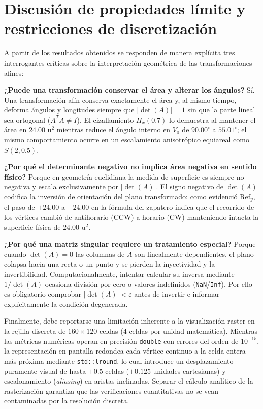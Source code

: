 \documentclass[a4paper,10pt]{article}
\begin{document}
\section{Discusión de propiedades límite y restricciones de discretización}

A partir de los resultados obtenidos se responden de manera explícita tres interrogantes críticas sobre la interpretación geométrica de las transformaciones afines:

\textbf{¿Puede una transformación conservar el área y alterar los ángulos?} Sí. Una transformación afín conserva exactamente el área y, al mismo tiempo, deforma ángulos y longitudes siempre que $|\det(A)|=1$ sin que la parte lineal sea ortogonal ($A^T A \neq I$). El cizallamiento $H_x(0.7)$ lo demuestra al mantener el área en $24.00\text{ u}^2$ mientras reduce el ángulo interno en $V_0$ de $90.00^\circ$ a $55.01^\circ$; el mismo comportamiento ocurre en un escalamiento anisotrópico equiareal como $S(2, 0.5)$.

\textbf{¿Por qué el determinante negativo no implica área negativa en sentido físico?} Porque en geometría euclidiana la medida de superficie es siempre no negativa y escala exclusivamente por $|\det(A)|$. El signo negativo de $\det(A)$ codifica la inversión de orientación del plano transformado: como evidenció $\mathrm{Ref}_y$, el paso de $+24.00$ a $-24.00$ en la fórmula del zapatero indica que el recorrido de los vértices cambió de antihorario (CCW) a horario (CW) manteniendo intacta la superficie física de $24.00\text{ u}^2$.

\textbf{¿Por qué una matriz singular requiere un tratamiento especial?} Porque cuando $\det(A) = 0$ las columnas de $A$ son linealmente dependientes, el plano colapsa hacia una recta o un punto y se pierden la inyectividad y la invertibilidad. Computacionalmente, intentar calcular su inversa mediante $1/\det(A)$ ocasiona división por cero o valores indefinidos (\texttt{NaN}/\texttt{Inf}). Por ello es obligatorio comprobar $|\det(A)| < \varepsilon$ antes de invertir e informar explícitamente la condición degenerada.

Finalmente, debe reportarse una limitación inherente a la visualización raster en la rejilla discreta de $160\times 120$ celdas ($4$ celdas por unidad matemática). Mientras las métricas numéricas operan en precisión \texttt{double} con errores del orden de $10^{-15}$, la representación en pantalla redondea cada vértice continuo a la celda entera más próxima mediante \texttt{std::lround}, lo cual introduce un desplazamiento puramente visual de hasta $\pm 0.5$ celdas ($\pm 0.125$ unidades cartesianas) y escalonamiento (\emph{aliasing}) en aristas inclinadas. Separar el cálculo analítico de la rasterización garantiza que las verificaciones cuantitativas no se vean contaminadas por la resolución discreta.
\end{document}

